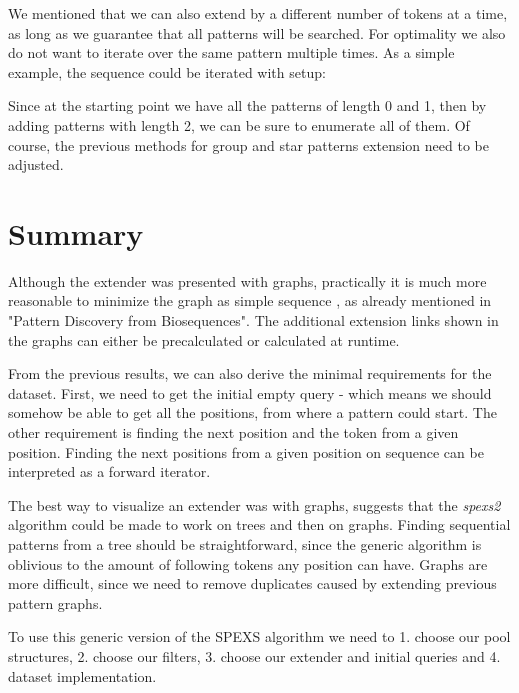 We mentioned that we can also extend by a different number of tokens at a time, as long as we guarantee that all patterns will be searched. For optimality we also do not want to iterate over the same pattern multiple times. As a simple example, the sequence  could be iterated with setup:

\begin{figure}[H]
	
\end{figure}

Since at the starting point we have all the patterns of length 0 and 1, then by adding patterns with length 2, we can be sure to enumerate all of them. Of course, the previous methods for group and star patterns extension need to be adjusted.

\section{Summary}

Although the extender was presented with graphs, practically it is much more reasonable to minimize the graph as simple sequence , as already mentioned in "Pattern Discovery from Biosequences"\cite{spexs}. The additional extension links shown in the graphs can either be precalculated or calculated at runtime.

From the previous results, we can also derive the minimal requirements for the dataset. First, we need to get the initial empty query - which means we should somehow be able to get all the positions, from where a pattern could start. The other requirement is finding the next position and the token from a given position. Finding the next positions from a given position on sequence can be interpreted as a forward iterator.

The best way to visualize an extender was with graphs, suggests that the \emph{spexs2} algorithm could be made to work on trees and then on graphs. Finding sequential patterns from a tree should be straightforward, since the generic algorithm is oblivious to the amount of following tokens any position can have. Graphs are more difficult, since we need to remove duplicates caused by extending previous pattern graphs\cite{SubgraphIsomorphism}.

To use this generic version of the SPEXS algorithm we need to 1. choose our pool structures, 2. choose our filters, 3. choose our extender and initial queries and 4. dataset implementation.
